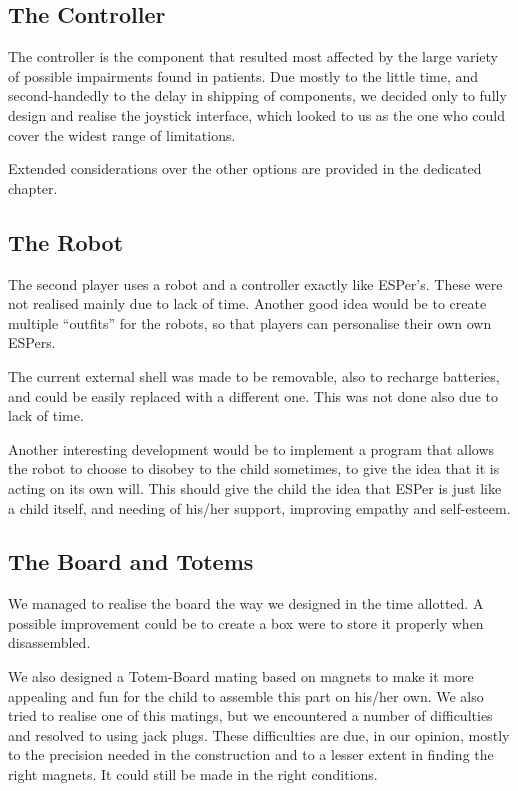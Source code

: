 \documentclass[a4paper,twoside]{book}
\begin{document}
\subsection*{The Controller}

The controller is the component that resulted most affected by the large variety of possible impairments found in patients. Due mostly to the little time, and second-handedly to the delay in shipping of components, we decided only to fully design and realise the joystick interface, which looked to us as the one who could cover the widest range of limitations.

Extended considerations over the other options are provided in the dedicated chapter.

\subsection*{The Robot}

The second player uses a robot and a controller exactly like ESPer's. These were not realised mainly due to lack of time. Another good idea would be to create multiple \textquotedblleft{}outfits\textquotedblright{} for the robots, so that players can  personalise their own own ESPers.

The current external shell was made to be removable, also to recharge batteries, and could be easily replaced with a different one. This was not done also due to lack of time. 

Another interesting development would be to implement a program that allows the robot to choose to disobey to the child sometimes, to give the idea that it is acting on its own will. This should give the child the idea that ESPer is just like a child itself, and needing of his/her support, improving empathy and self-esteem.

\subsection*{The Board and Totems}

We managed to realise the board the way we designed in the time allotted. A possible improvement could be to create a box were to store it properly when disassembled. 

We also designed a Totem-Board mating based on magnets to make it more appealing and fun for the child to assemble this part on his/her own. We also tried to realise one of this matings, but we encountered a number of difficulties and resolved to using jack plugs. These difficulties are due, in our opinion, mostly to the precision needed in the construction and  to a lesser extent in finding the right magnets. It could still be made in the right conditions.
\end{document}

